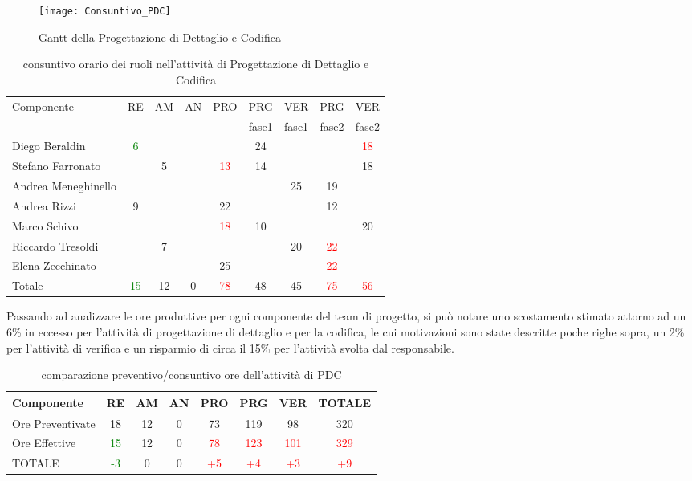 \begin{figure}[h]
  \texttt{[image: Consuntivo\_PDC]}
\caption{Gantt della Progettazione di Dettaglio e Codifica}\label{fig:ganttpdcconsuntivo}
\end{figure}

\begin{table}[h!]
\centering
\begin{tabular}{|l|c|c|c|c|c|c|c|c|}
\hline
\multirow{2}{*}{Componente}& RE& AM& AN& PRO& PRG&VER& PRG& VER \\
					      &    &     &      &        & fase1&fase1&fase2&fase2\\
\hline
Diego Beraldin & \textcolor{green}{6}& & & & 24& & & \textcolor{red}{18}\\
Stefano Farronato & & 5& & \textcolor{red}{13}&14 & & & 18\\
Andrea Meneghinello & & & & & & 25& 19& \\
Andrea Rizzi & 9& & & 22& & & 12& \\
Marco Schivo & & & &\textcolor{red}{18}& 10& & & 20\\
Riccardo Tresoldi & & 7& & & & 20& \textcolor{red}{22}& \\
Elena Zecchinato & & & & 25& & & \textcolor{red}{22}& \\
\hline
Totale & \textcolor{green}{15}& 12& 0& \textcolor{red}{78}& 48& 45& \textcolor{red}{75}& \textcolor{red}{56}\\
\hline
\end{tabular}
\caption{consuntivo orario dei ruoli nell'attività di Progettazione di Dettaglio e Codifica}\label{tab:consruolipdc}
\end{table}

Passando ad analizzare le ore produttive per ogni componente del team di progetto, si può notare uno scostamento stimato attorno ad un 6\% in eccesso per l'attività di progettazione di dettaglio e per la codifica, le cui motivazioni sono state descritte poche righe sopra, un 2\% per l'attività di verifica e un risparmio di circa il 15\% per l'attività svolta dal responsabile. 
\begin{table}[H]
\centering
\begin{tabular}{|l|c c c c c c|c|}
\hline
Componente		& RE&   AM&   AN&  PRO& PRG& VER & TOTALE\\
\hline
Ore Preventivate	& 18&    12&   0&  73& 119&    98  & 320\\
Ore Effettive       	& \textcolor{green}{15} &   12&   0&  \textcolor{red}{78}& \textcolor{red}{123}&     \textcolor{red}{101} & \textcolor{red}{329}\\
\hline
TOTALE			& \textcolor{green}{-3}&    0&    0&    \textcolor{red}{+5}&\textcolor{red}{+4}& \textcolor{red}{+3}& \textcolor{red}{+9}\\
\hline
\end{tabular}
\caption{comparazione preventivo/consuntivo ore dell'attività di PDC}\label{tab:consorepdc}
\end{table}


